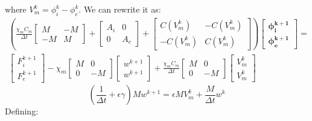 \documentclass[a4paper,12pt]{article}
\begin{document}
where $V_m^k=\phi_i^k-\phi_e^k$.\newline
\vspace{5mm}
We can rewrite it as:
\begin{equation}
\begin{gathered}
\left( \frac{\chi_m C_m}{\Delta t} \begin{bmatrix} M & -M \\ -M & M \end{bmatrix} + \begin{bmatrix} A_i & 0 \\ 0 & A_e \end{bmatrix} + 
\begin{bmatrix}
C(V_m^k) & -C(V_m^k) \\ -C(V_m^k) & C(V_m^k)
\end{bmatrix}\right)
\begin{bmatrix} \bm{\phi_i^{k+1}} \\ \bm{\phi_e^{k+1}} \end{bmatrix} = 
\\
\begin{bmatrix} F_i^{k+1} \\ F_e^{k+1} \end{bmatrix} 
- \chi_m \begin{bmatrix}M & 0 \\ 0 & -M \end{bmatrix}
\begin{bmatrix} w^{k+1} \\ w^{k+1} \end{bmatrix}
+ \frac{\chi_m C_m}{\Delta t} \begin{bmatrix}M & 0 \\ 0 & -M\end{bmatrix}
\begin{bmatrix} V_m^{k} \\ V_m^{k} \end{bmatrix}
\end{gathered}
\end{equation}
\begin{equation}
(\frac{1}{\Delta t}+\epsilon \gamma)M w^{k+1}=\epsilon M V_m^k+\frac{M}{\Delta t} w^k
\end{equation}
\vspace{5mm}
Defining:
\end{document}
